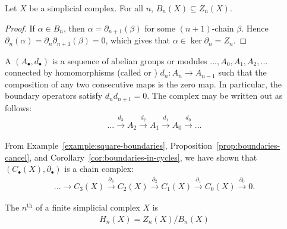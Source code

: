     \begin{corollary}\label{cor:boundaries-in-cycles}
        Let $X$ be a simplicial complex. For all $n$, $B_n(X) \subseteq Z_n(X)$.
    \end{corollary}
        \begin{proof}
            If $\alpha \in B_n$, then $\alpha = \partial_{n+1}(\beta)$ for some $(n+1)$-chain $\beta$. Hence $\partial_n(\alpha) = \partial_n \partial_{n+1}(\beta) = 0$, which gives that $\alpha \in \ker{\partial_n} = Z_n$. 
        \end{proof}

    \begin{definition}\label{def:chain-complex}
        A  $(A_{\bullet},d_{\bullet})$ is a sequence of abelian groups or modules $...,A_0,A_1,A_2,...$ connected by homomorphisms (called  or ) $d_n : A_n \rightarrow A_{n-1}$ such that the composition of any two consecutive maps is the zero map. In particular, the boundary operators satisfy $d_n d_{n+1} = 0$. The complex may be written out as follows:
            \begin{equation*}
            \begin{split}
                ... \xrightarrow{d_3} A_2 \xrightarrow{d_2} A_1 \xrightarrow{d_1} A_0 \xrightarrow{d_0} ...
            \end{split}
            \end{equation*}
    \end{definition}

    \begin{example}
        From Example~\ref{example:square-boundaries}, Proposition~\ref{prop:boundaries-cancel}, and Corollary~\ref{cor:boundaries-in-cycles}, we have shown that $(C_{\bullet}(X),\partial_{\bullet})$ is a chain complex:
            \begin{equation*}
            \begin{split}
                ... \rightarrow C_3(X) \xrightarrow{\partial_3} C_2(X) \xrightarrow{\partial_2} C_1(X) \xrightarrow{\partial_1} C_0(X) \xrightarrow{\partial_0} 0.
            \end{split}
            \end{equation*}
    \end{example}

    \begin{definition}\label{def:}
        The $n^{\text{th}}$  of a finite simplicial complex $X$ is
            \begin{equation*}
            \begin{split}
                H_n(X) = Z_n(X)/B_n(X)
            \end{split}
            \end{equation*}
    \end{definition}

